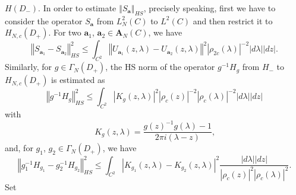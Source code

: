 \documentclass[a4paper]{article}%
\begin{document}
$H\left(  D_{-}\right)  $. In order to estimate $\left\Vert S_{\boldsymbol{a}%
}\right\Vert _{HS}$, precisely speaking, first we have to consider the
operator $S_{\boldsymbol{a}}$ from $L_{N}^{2}\left(  C\right)  $ to
$L^{2}\left(  C\right)  $ and then restrict it to $H_{N,c}\left(
D_{+}\right)  $. For two $\boldsymbol{a}_{1}$, $\boldsymbol{a}_{2}%
\in\boldsymbol{A}_{N}\left(  C\right)  $, we have%
\begin{equation}
\left\Vert S_{\boldsymbol{a}_{1}}-S_{\boldsymbol{a}_{2}}\right\Vert _{HS}%
^{2}\leq\int_{C^{2}}\left\Vert U_{\boldsymbol{a}_{1}}\left(  z,\lambda\right)
-U_{\boldsymbol{a}_{2}}\left(  z,\lambda\right)  \right\Vert ^{2}\left\vert
\rho_{2c}\left(  \lambda\right)  \right\vert ^{-2}\left\vert d\lambda
\right\vert \left\vert dz\right\vert \text{.} \label{2-9}%
\end{equation}
Similarly, for $g\in\Gamma_{N}\left(  D_{+}\right)  $, the HS norm of the
operator $g^{-1}H_{g}$ from $H_{-}$ to $H_{N,c}\left(  D_{+}\right)  $ is
estimated as%
\[
\left\Vert g^{-1}H_{g}\right\Vert _{HS}^{2}\leq\int_{C^{2}}\left\vert
K_{g}\left(  z,\lambda\right)  \right\vert ^{2}\left\vert \rho_{c}\left(
z\right)  \right\vert ^{-2}\left\vert \rho_{c}\left(  \lambda\right)
\right\vert ^{-2}\left\vert d\lambda\right\vert \left\vert dz\right\vert
\]
with%
\[
K_{g}\left(  z,\lambda\right)  =\dfrac{g\left(  z\right)  ^{-1}g\left(
\lambda\right)  -1}{2\pi i\left(  \lambda-z\right)  }\text{,}%
\]
and, for $g_{1}$, $g_{2}\in\Gamma_{N}\left(  D_{+}\right)  $, we have
\begin{equation}
\left\Vert g_{1}^{-1}H_{g_{1}}-g_{2}^{-1}H_{g_{2}}\right\Vert _{HS}^{2}%
\leq\int_{C^{2}}\left\vert K_{g_{1}}\left(  z,\lambda\right)  -K_{g_{2}%
}\left(  z,\lambda\right)  \right\vert ^{2}\dfrac{\left\vert d\lambda
\right\vert \left\vert dz\right\vert }{\left\vert \rho_{c}\left(  z\right)
\right\vert ^{2}\left\vert \rho_{c}\left(  \lambda\right)  \right\vert ^{2}%
}\text{.} \label{2-10}%
\end{equation}
Set%
\end{document}
